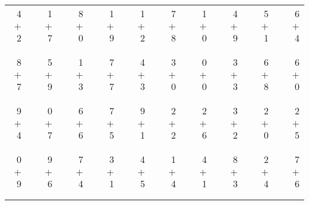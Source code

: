 \documentclass[12pt, letterpaper]{article}
\begin{document}
\begin{tabular}{rrrrrrrrrrrrrrrrrrr}
4 & & 1 & & 8 & & 1 & & 1 & & 7 & & 1 & & 4 & & 5 & & 6\\
$+$ 2 & & $+$ 7 & & $+$ 0 & & $+$ 9 & & $+$ 2 & & $+$ 8 & & $+$ 0 & & $+$ 9 & & $+$ 1 & & $+$ 4\\
\cline{1-1} \cline{3-3} \cline{5-5} \cline{7-7} \cline{9-9} \cline{11-11} \cline{13-13} \cline{15-15} \cline{17-17} \cline{19-19} \\ \\
8 & & 5 & & 1 & & 7 & & 4 & & 3 & & 0 & & 3 & & 6 & & 6\\
$+$ 7 & & $+$ 9 & & $+$ 3 & & $+$ 7 & & $+$ 3 & & $+$ 0 & & $+$ 0 & & $+$ 3 & & $+$ 8 & & $+$ 0\\
\cline{1-1} \cline{3-3} \cline{5-5} \cline{7-7} \cline{9-9} \cline{11-11} \cline{13-13} \cline{15-15} \cline{17-17} \cline{19-19} \\ \\
9 & & 0 & & 6 & & 7 & & 9 & & 2 & & 2 & & 3 & & 2 & & 2\\
$+$ 4 & & $+$ 7 & & $+$ 6 & & $+$ 5 & & $+$ 1 & & $+$ 2 & & $+$ 6 & & $+$ 2 & & $+$ 0 & & $+$ 5\\
\cline{1-1} \cline{3-3} \cline{5-5} \cline{7-7} \cline{9-9} \cline{11-11} \cline{13-13} \cline{15-15} \cline{17-17} \cline{19-19} \\ \\
0 & & 9 & & 7 & & 3 & & 4 & & 1 & & 4 & & 8 & & 2 & & 7\\
$+$ 9 & & $+$ 6 & & $+$ 4 & & $+$ 1 & & $+$ 5 & & $+$ 4 & & $+$ 1 & & $+$ 3 & & $+$ 4 & & $+$ 6\\
\cline{1-1} \cline{3-3} \cline{5-5} \cline{7-7} \cline{9-9} \cline{11-11} \cline{13-13} \cline{15-15} \cline{17-17} \cline{19-19} \\ \\
\end{tabular}
\newpage
\end{document}
